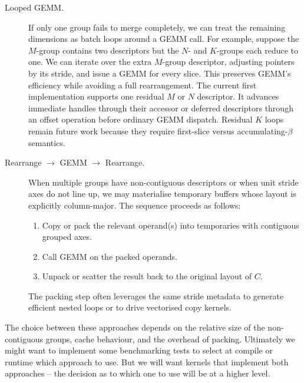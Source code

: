 \documentclass[11pt]{article}
\begin{document}
\begin{description}
  \item[Looped GEMM.]  If only one group fails to merge completely, we can treat the remaining
        dimensions as batch loops around a GEMM call.  For example, suppose the $M$-group contains
        two descriptors but the $N$- and $K$-groups each reduce to one.  We can iterate over the
        extra $M$-group descriptor, adjusting pointers by its stride, and issue a GEMM for every
        slice.  This preserves GEMM's efficiency while avoiding a full rearrangement.  The current
        first implementation supports one residual $M$ or $N$ descriptor.  It advances immediate
        handles through their accessor or deferred descriptors through an offset operation before
        ordinary GEMM dispatch.  Residual $K$ loops remain future work because they require
        first-slice versus accumulating-$\beta$ semantics.
  \item[Rearrange $\rightarrow$ GEMM $\rightarrow$ Rearrange.]  When multiple groups have
        non-contiguous descriptors or when unit stride axes do not line up, we may materialise
        temporary buffers whose layout is explicitly column-major.  The sequence proceeds as follows:
        \begin{enumerate}
          \item Copy or pack the relevant operand(s) into temporaries with contiguous grouped axes.
          \item Call GEMM on the packed operands.
          \item Unpack or scatter the result back to the original layout of $C$.
        \end{enumerate}
        The packing step often leverages the same stride metadata to generate efficient nested loops
        or to drive vectorised copy kernels.
\end{description}

The choice between these approaches depends on the relative size of the non-contiguous groups,
cache behaviour, and the overhead of packing. Ultimately we might want to implement some benchmarking
tests to select at compile or runtime which approach to use. But we will want kernels that implement
both approaches -- the decision as to which one to use will be at a higher level.
\end{document}
